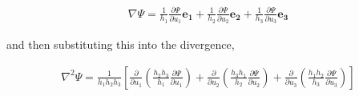 \documentclass[11pt]{amsart}
\begin{document}
\begin{align*}
  \nabla\Psi = \frac{1}{h_1}\frac{\partial\Psi}{\partial u_1} \mathbf{e_1} + \frac{1}{h_2}\frac{\partial\Psi}{\partial u_2} \mathbf{e_2} + \frac{1}{h_3}\frac{\partial\Psi}{\partial u_3} \mathbf{e_3}
\end{align*}

and then substituting this into the divergence,

\begin{align*}
  \nabla^2\Psi = \frac{1}{h_1h_2h_3}\left[\frac{\partial}{\partial u_1}\left(\frac{h_2h_3}{h_1}\frac{\partial\Psi}{\partial u_1}\right) + \frac{\partial}{\partial u_2}\left(\frac{h_3h_1}{h_2}\frac{\partial\Psi}{\partial u_2}\right) + \frac{\partial}{\partial u_3}\left(\frac{h_1h_2}{h_3}\frac{\partial\Psi}{\partial u_3}\right)\right]
\end{align*}
\end{document}
